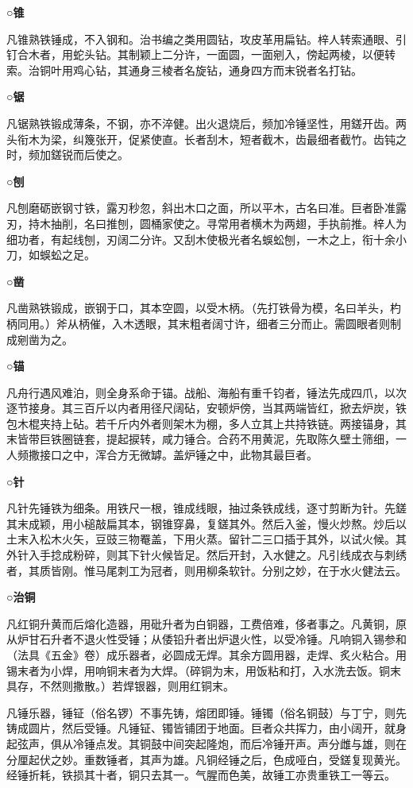 \documentclass[]{article}
\begin{document}
\textbf{○锥}

凡锥熟铁锤成，不入钢和。治书编之类用圆钻，攻皮革用扁钻。梓人转索通眼、引钉合木者，用蛇头钻。其制颖上二分许，一面圆，一面剜入，傍起两棱，以便转索。治铜叶用鸡心钻，其通身三棱者名旋钻，通身四方而末锐者名打钻。

\textbf{○锯}

凡锯熟铁锻成薄条，不钢，亦不淬健。出火退烧后，频加冷锤坚性，用鎈开齿。两头衔木为梁，纠篾张开，促紧使直。长者刮木，短者截木，齿最细者截竹。齿钝之时，频加鎈锐而后使之。

\textbf{○刨}

凡刨磨砺嵌钢寸铁，露刃秒忽，斜出木口之面，所以平木，古名曰准。巨者卧准露刃，持木抽削，名曰推刨，圆桶家使之。寻常用者横木为两翅，手执前推。梓人为细功者，有起线刨，刃阔二分许。又刮木使极光者名蜈蚣刨，一木之上，衔十余小刀，如蜈蚣之足。

\textbf{○凿}

凡凿熟铁锻成，嵌钢于口，其本空圆，以受木柄。（先打铁骨为模，名曰羊头，杓柄同用。）斧从柄催，入木透眼，其末粗者阔寸许，细者三分而止。需圆眼者则制成剜凿为之。

\textbf{○锚}

凡舟行遇风难泊，则全身系命于锚。战船、海船有重千钧者，锤法先成四爪，以次逐节接身。其三百斤以内者用径尺阔砧，安顿炉傍，当其两端皆红，掀去炉炭，铁包木棍夹持上砧。若千斤内外者则架木为棚，多人立其上共持铁链。两接锚身，其末皆带巨铁圈链套，提起捩转，咸力锤合。合药不用黄泥，先取陈久壁土筛细，一人频撒接口之中，浑合方无微罅。盖炉锤之中，此物其最巨者。

\textbf{○针}

凡针先锤铁为细条。用铁尺一根，锥成线眼，抽过条铁成线，逐寸剪断为针。先鎈其末成颖，用小槌敲扁其本，钢锥穿鼻，复鎈其外。然后入釜，慢火炒熬。炒后以土末入松木火矢，豆豉三物罨盖，下用火蒸。留针二三口插于其外，以试火候。其外针入手捻成粉碎，则其下针火候皆足。然后开封，入水健之。凡引线成衣与刺绣者，其质皆刚。惟马尾刺工为冠者，则用柳条软针。分别之妙，在于水火健法云。

\textbf{○治铜}

凡红铜升黄而后熔化造器，用砒升者为白铜器，工费倍难，侈者事之。凡黄铜，原从炉甘石升者不退火性受锤；从倭铅升者出炉退火性，以受冷锤。凡响铜入锡参和（法具《五金》卷）成乐器者，必圆成无焊。其余方圆用器，走焊、炙火粘合。用锡末者为小焊，用响铜末者为大焊。（碎铜为末，用饭粘和打，入水洗去饭。铜末具存，不然则撒散。）若焊银器，则用红铜末。

凡锤乐器，锤钲（俗名锣）不事先铸，熔团即锤。锤镯（俗名铜鼓）与丁宁，则先铸成圆片，然后受锤。凡锤钲、镯皆铺团于地面。巨者众共挥力，由小阔开，就身起弦声，俱从冷锤点发。其铜鼓中间突起隆炮，而后冷锤开声。声分雌与雄，则在分厘起伏之妙。重数锤者，其声为雄。凡铜经锤之后，色成哑白，受鎈复现黄光。经锤折耗，铁损其十者，铜只去其一。气腥而色美，故锤工亦贵重铁工一等云。
\end{document}
